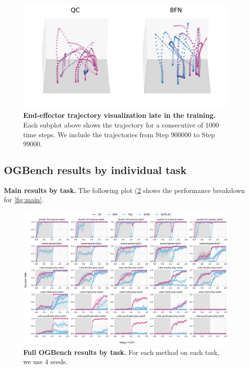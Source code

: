 \begin{figure}[H]
\includegraphics[width=0.32\linewidth]{figures/viz/traj_viz_comb_908_simplified.pdf}
\caption{\textbf{End-effector trajectory visualization late in the training.} Each subplot above shows the trajectory for a consecutive of 1000 time steps. We include the trajectories from Step 900000 to Step 99000.}
\label{fig:traj-viz-late}
\end{figure}

\subsection{OGBench results by individual task}

\textbf{Main results by task.} The following plot (\cref{fig:main-all-individual} shows the performance breakdown for \cref{fig:main}.
\begin{figure}[H]
    \centering
\includegraphics[width=\linewidth]{figures/main-all-individual-ablation.pdf} %
    \caption{\textbf{Full OGBench results by task.} For each method on each task, we use 4 seeds.}
    \label{fig:main-all-individual}
\end{figure}


